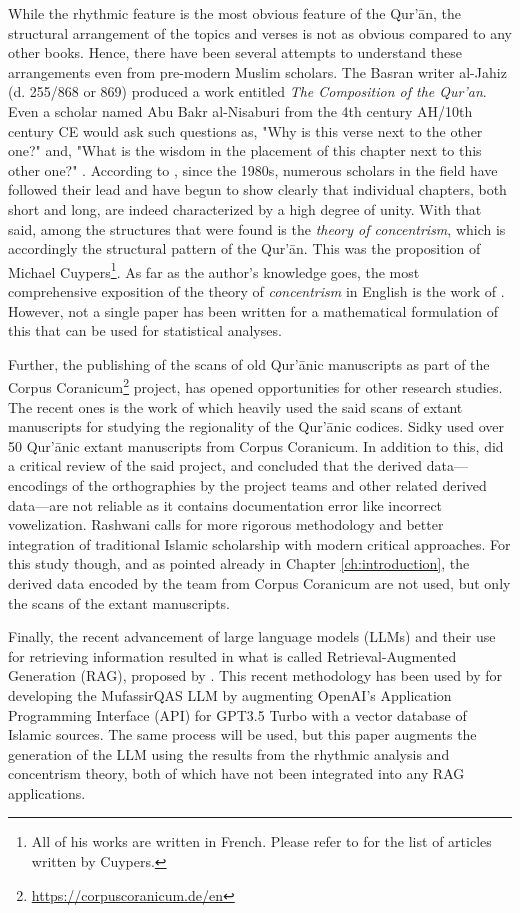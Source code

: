 While the rhythmic feature is the most obvious feature of the Qur'\=an, the structural arrangement of the topics and verses is not as obvious compared to any other books. Hence, there have been several attempts to understand these arrangements even from pre-modern Muslim scholars. The Basran writer al-Jahiz (d. 255/868 or 869) produced a work entitled \textit{The Composition of the Qur'an}. Even a scholar named Abu Bakr al-Nisaburi from the 4th century AH/10th century CE would ask such questions as, "Why is this verse next to the other one?" and, "What is the wisdom in the placement of this chapter next to this other one?" . According to , since the 1980s, numerous scholars in the field have followed their lead and have begun to show clearly that individual chapters, both short and long, are indeed characterized by a high degree of unity. With that said, among the structures that were found is the \textit{theory of concentrism}, which is accordingly the structural pattern of the Qur'\=an. This was the proposition of Michael Cuypers\footnote{All of his works are written in French. Please refer to  for the list of articles written by Cuypers.}. As far as the author's knowledge goes, the most comprehensive exposition of the theory of \textit{concentrism} in English is the work of . However, not a single paper has been written for a mathematical formulation of this that can be used for statistical analyses. 

Further, the publishing of the scans of old Qur'\=anic manuscripts as part of the Corpus Coranicum\footnote{\url{https://corpuscoranicum.de/en}} project, has opened opportunities for other research studies. The recent ones is the work of  which heavily used the said scans of extant manuscripts for studying the regionality of the Qur'\=anic codices. Sidky used over 50 Qur'\=anic extant manuscripts from Corpus Coranicum. In addition to this,  did a critical review of the said project, and concluded that the derived data---encodings of the orthographies by the project teams and other related derived data---are not reliable as it contains documentation error like incorrect vowelization. Rashwani calls for more rigorous methodology and better integration of traditional Islamic scholarship with modern critical approaches. For this study though, and as pointed already in Chapter \ref{ch:introduction}, the derived data encoded by the team from Corpus Coranicum are not used, but only the scans of the extant manuscripts.

Finally, the recent advancement of large language models (LLMs) and their use for retrieving information resulted in what is called Retrieval-Augmented Generation (RAG), proposed by . This recent methodology has been used by  for developing the MufassirQAS LLM by augmenting OpenAI's Application Programming Interface (API) for GPT3.5 Turbo with a vector database of Islamic sources. The same process will be used, but this paper augments the generation of the LLM using the results from the rhythmic analysis and concentrism theory, both of which have not been integrated into any RAG applications.